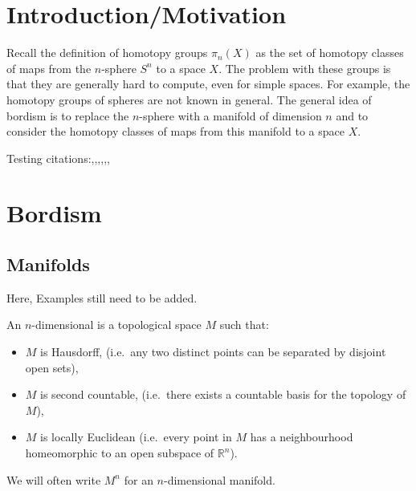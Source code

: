 \documentclass[a4paper,11pt]{article}
\begin{document}
\maketitle
{}
\tableofcontents\newpage

\begin{comment}
\newgeometry{
	left=20mm, %
    top=25mm,
    right=20mm, %
  bmargin=2cm %
}
\end{comment}

\setcounter{section}{-1}

\section{Introduction/Motivation}

Recall the definition of homotopy groups \(\pi_n(X)\) as the set of homotopy classes of maps from the \(n\)-sphere \(S^n\) to a space \(X\). 
The problem with these groups is that they are generally hard to compute, even for simple spaces. 
For example, the homotopy groups of spheres are not known in general.
The general idea of bordism is to replace the \(n\)-sphere with a manifold of dimension \(n\) and to consider the homotopy classes of maps from this manifold to a space \(X\).

Testing citations:\cite{atiyah},\cite{brocker},\cite{thom},\cite{lee},\cite{hatcher},\cite{dieck},\cite{luck}

\section{Bordism}

\subsection{Manifolds}
Here, Examples still need to be added.

\begin{definition}
    An \(n\)-dimensional  is a topological space \(M\) such that:
    \begin{itemize}
        \item \(M\) is Hausdorff, (i.e.\ any two distinct points can be separated by disjoint open sets),
        \item \(M\) is second countable, (i.e.\ there exists a countable basis for the topology of \(M\)),
        \item \(M\) is locally Euclidean (i.e.\ every point in \(M\) has a neighbourhood homeomorphic to an open subspace of \(\mathbb{R}^n\)).
    \end{itemize}
    We will often write \(M^n\) for an \(n\)-dimensional manifold.
\end{definition}
\end{document}
